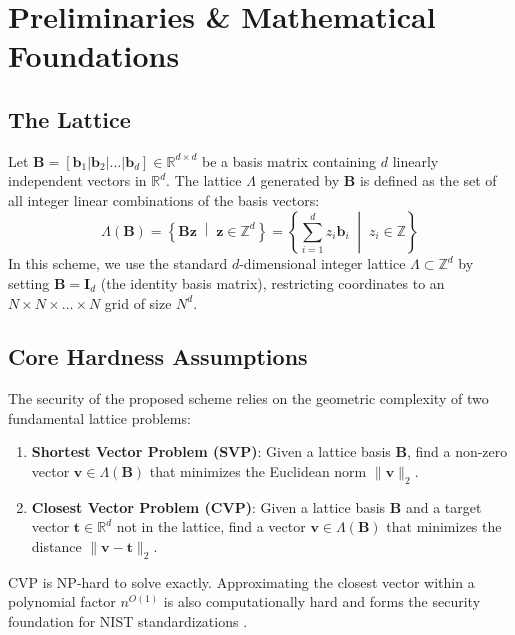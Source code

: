 \documentclass[conference,a4paper]{IEEEtran}
\begin{document}
\section{Preliminaries \& Mathematical Foundations}

\subsection{The Lattice}
Let $\mathbf{B} = [\mathbf{b}_1 | \mathbf{b}_2 | \dots | \mathbf{b}_d] \in \mathbb{R}^{d \times d}$ be a basis matrix containing $d$ linearly independent vectors in $\mathbb{R}^d$. The lattice $\Lambda$ generated by $\mathbf{B}$ is defined as the set of all integer linear combinations of the basis vectors:
\begin{equation}
\Lambda(\mathbf{B}) = \left\{ \mathbf{B}\mathbf{z} \;\middle|\; \mathbf{z} \in \mathbb{Z}^d \right\} = \left\{ \sum_{i=1}^d z_i \mathbf{b}_i \;\middle|\; z_i \in \mathbb{Z} \right\}
\end{equation}
In this scheme, we use the standard $d$-dimensional integer lattice $\Lambda \subset \mathbb{Z}^d$ by setting $\mathbf{B} = \mathbf{I}_d$ (the identity basis matrix), restricting coordinates to an $N \times N \times \dots \times N$ grid of size $N^d$.

\subsection{Core Hardness Assumptions}
The security of the proposed scheme relies on the geometric complexity of two fundamental lattice problems:
\begin{enumerate}
    \item \textbf{Shortest Vector Problem (SVP)}: Given a lattice basis $\mathbf{B}$, find a non-zero vector $\mathbf{v} \in \Lambda(\mathbf{B})$ that minimizes the Euclidean norm $\|\mathbf{v}\|_2$.
    \item \textbf{Closest Vector Problem (CVP)}: Given a lattice basis $\mathbf{B}$ and a target vector $\mathbf{t} \in \mathbb{R}^d$ not in the lattice, find a vector $\mathbf{v} \in \Lambda(\mathbf{B})$ that minimizes the distance $\|\mathbf{v} - \mathbf{t}\|_2$.
\end{enumerate}
CVP is NP-hard to solve exactly. Approximating the closest vector within a polynomial factor $n^{O(1)}$ is also computationally hard and forms the security foundation for NIST standardizations \cite{regev}.
\end{document}
